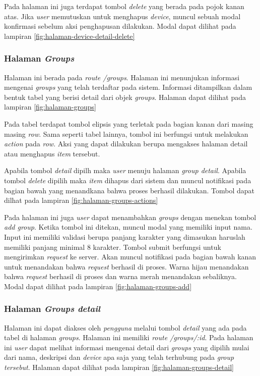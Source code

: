 Pada halaman ini juga terdapat tombol \textit{delete} yang berada pada pojok kanan atas. Jika \textit{user} memutuskan untuk menghapus \textit{device}, muncul sebuah modal konfirmasi sebelum aksi penghapusan dilakukan. Modal dapat dilihat pada lampiran \ref{fig:halaman-device-detail-delete}

\subsubsection{Halaman \textit{Groups}}
Halaman ini berada pada \textit{route /groups}. Halaman ini menunjukan informasi mengenai \textit{groups} yang telah terdaftar pada sistem. Informasi ditampilkan dalam bentuk tabel yang berisi detail dari objek \textit{groups}. Halaman dapat dilihat pada lampiran \ref{fig:halaman-groups}

Pada tabel terdapat tombol elipsis yang terletak pada bagian kanan dari masing masing \textit{row}. Sama seperti tabel lainnya, tombol ini berfungsi untuk melakukan \textit{action} pada \textit{row}. Aksi yang dapat dilakukan berupa mengakses halaman detail atau menghapus \textit{item} tersebut.

Apabila tombol \textit{detail} dipilh maka \textit{user} menuju halaman \textit{group detail}. Apabila tombol \textit{delete} dipilih maka \textit{item} dihapus dari sistem dan muncul notifikasi pada bagian bawah yang menandkana bahwa proses berhasil dilakukan. Tombol dapat dilhat pada lampiran \ref{fig:halaman-groups-actions}

Pada halaman ini juga \textit{user} dapat menambahkan \textit{groups} dengan menekan tombol \textit{add group}. Ketika tombol ini ditekan, muncul modal yang memiliki input nama. Input ini memiliki validasi berupa panjang karakter yang dimasukan haruslah memiliki panjang minimal 8 karakter. Tombol submit berfungsi untuk mengirimkan \textit{request} ke server. Akan muncul notifikasi pada bagian bawah kanan untuk menandakan bahwa \textit{request} berhasil di proses. Warna hijau menandakan bahwa \textit{request} berhasil di proses dan warna merah menandakan sebaliknya. Modal dapat dilihat pada lampiran \ref{fig:halaman-groups-add}

\subsubsection{Halaman \textit{Groups detail}}
Halaman ini dapat diakses oleh \textit{pengguna} melalui tombol \textit{detail} yang ada pada tabel di halaman \textit{groups}. Halaman ini memiliki \textit{route /groups/:id}. Pada halaman ini \textit{user} dapat melihat informasi mengenai detail dari \textit{groups} yang dipilih mulai dari nama, deskripsi dan \textit{device} apa saja yang telah terhubung pada \textit{group tersebut}. Halaman dapat dilihat pada lampiran \ref{fig:halaman-groups-detail}

